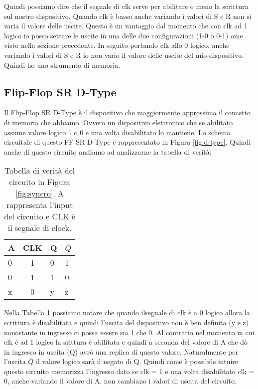 Quindi possiamo dire che il segnale di clk serve per abilitare o meno la scrittura sul nostro dispositivo. Quando clk è basso anche variando i valori di S e R non si varia il valore delle uscite. Questo è un vantaggio dal momento che con clk ad 1 logico io posso settare le uscite in una delle due configurazioni (1-0 o 0-1) ome visto nella sezione precedente. In seguito portando clk allo 0 logico, anche variando i valori di S e R io non vario il valore delle uscite del mio dispositivo. Quindi ho uno strumento di memoria.  

\subsection*{Flip-Flop SR D-Type}

Il Flip-Flop SR D-Type è il dispositivo che maggiormente approssima il concetto di memoria che abbiamo. Ovvero un dispositivo elettronico che se abilitato assume valore logico 1 o 0 e una volta disabilitato lo mantiene. Lo schema circuitale di questo FF SR D-Type è rappresentato in Figura \ref{fig:d-type}.
Quindi anche di questo circuito andiamo ad analizzarne la tabella di verità:

\begin{table}[h]
    \centering
    \begin{tabular}{lc|ll}
	\toprule
		A & CLK & Q & $\overline{Q}$ \\
	\midrule
		0 & 1 & 0 & 1 \\
		0 & 1 & 1 & 0 \\
		x & 0 & y & z \\
	\bottomrule
	\end{tabular}
    \caption{Tabella di verità del circuito in Figura \ref{fig:syncro}. A rappresenta l'input del circuito e CLK è il segnale di clock.}
    \label{tab:d-type}
\end{table}

Nella Tabella \ref{tab:d-type} possiamo notare che quando ilsegnale di clk è a 0 logico allora la scrittura è disabilitata e quindi l'uscita del dispositivo non è ben definita (y e z) nonostante in ingresso ci possa essere sia 1 che 0. Al contrario nel momento in cui clk è ad 1 logico la srittura è abilitata e quindi a seconda del valore di A che dò in ingresso in uscita (Q) avrò una replica di questo valore. Naturalmente per l'uscita $\overline{Q}$ il valore logico sarà il negato di Q.
Quindi come è possibile intuire questo circuito memorizza l'ingresso dato se clk = 1 e una volta disabilitato clk = 0, anche variando il valore di A, non cambiano i valori di uscita del circuito.

